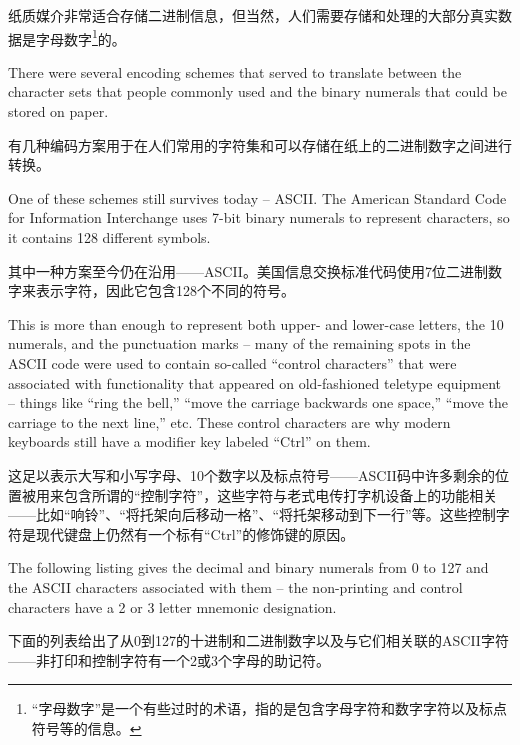 纸质媒介非常适合存储二进制信息，但当然，人们需要存储和处理的大部分真实数据是字母数字\footnote{“字母数字”是一个有些过时的术语，指的是包含字母字符和数字字符以及标点符号等的信息。}的。

There were several encoding schemes that served to translate between the
character sets that people commonly used and the binary numerals that could
be stored on paper.

有几种编码方案用于在人们常用的字符集和可以存储在纸上的二进制数字之间进行转换。

One of these schemes still survives today -- 
ASCII.
The American Standard Code for Information Interchange uses 7-bit binary
numerals to represent characters, so it contains 128 different symbols.

其中一种方案至今仍在沿用——ASCII。美国信息交换标准代码使用7位二进制数字来表示字符，因此它包含128个不同的符号。

This is more than enough to represent both upper- and lower-case 
letters, the 10 numerals, and the punctuation marks -- many of the 
remaining spots in the ASCII code were used to contain so-called 
``control characters'' that were associated with functionality that
appeared on old-fashioned teletype equipment -- things like ``ring the bell,''
``move the carriage backwards one space,''  ``move the carriage 
to the next line,'' etc.   These control characters are why modern 
keyboards still have a modifier key labeled ``Ctrl'' on them.

这足以表示大写和小写字母、10个数字以及标点符号——ASCII码中许多剩余的位置被用来包含所谓的“控制字符”，这些字符与老式电传打字机设备上的功能相关——比如“响铃”、“将托架向后移动一格”、“将托架移动到下一行”等。这些控制字符是现代键盘上仍然有一个标有“Ctrl”的修饰键的原因。

The 
following listing gives the decimal and binary numerals from 0 to 127
and the ASCII characters associated with them -- the non-printing and
control characters have a 2 or 3 letter mnemonic designation.

下面的列表给出了从0到127的十进制和二进制数字以及与它们相关联的ASCII字符——非打印和控制字符有一个2或3个字母的助记符。

\renewcommand{\baselinestretch}{.9}
\renewcommand{\arraystretch}{.9}


